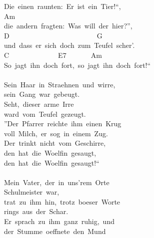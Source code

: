 \documentclass[]{book}
\begin{document}
Die~einen~raunten:~Er~ist~ein~Tier!``,~~\\
\hspace*{0.333em}\hspace*{0.333em}\hspace*{0.333em}\hspace*{0.333em}\hspace*{0.333em}\hspace*{0.333em}\hspace*{0.333em}\hspace*{0.333em}\hspace*{0.333em}\hspace*{0.333em}\hspace*{0.333em}Am~~\\
die~andern~fragten:~Was~will~der~hier?'',\\
\hspace*{0.333em}D~~~~~~~~~~~~~~~~~~~~~~~~~G\\
und~dass~er~sich~doch~zum~Teufel~scher'.\\
\hspace*{0.333em}\hspace*{0.333em}\hspace*{0.333em}\hspace*{0.333em}\hspace*{0.333em}C~~~~~~~~~~~~~~E7~~~~~~~Am\\
So~jagt~ihn~doch~fort,~so~jagt~ihn~doch~fort!``\\
~\\
Sein~Haar~in~Straehnen~und~wirre,\\
sein~Gang~war~gebeugt.\\
Seht,~dieser~arme~Irre\\
ward~vom~Teufel~gezeugt.\\
''Der~Pfarrer~reichte~ihm~einen~Krug\\
voll~Milch,~er~sog~in~einem~Zug.\\
Der~trinkt~nicht~vom~Geschirre,\\
den~hat~die~Woelfin~gesaugt,\\
den~hat~die~Woelfin~gesaugt!``\\
~\\
Mein~Vater,~der~in~uns'rem~Orte\\
Schulmeister~war,\\
trat~zu~ihm~hin,~trotz~boeser~Worte\\
rings~aus~der~Schar.\\
Er~sprach~zu~ihm~ganz~ruhig,~und\\
der~Stumme~oeffnete~den~Mund\\
\end{document}
